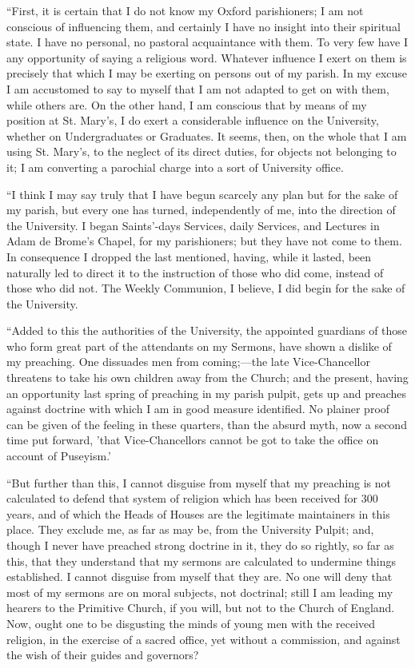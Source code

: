 ``First, it is certain that I do not know my Oxford parishioners;
I am not conscious of influencing them, and certainly I have no insight
into their spiritual state. I have no personal, no pastoral acquaintance
with them. To very few have I any opportunity of saying a religious
word. Whatever influence I exert on them is precisely that which I may
be exerting on persons out of my parish. In my excuse I am accustomed to
say to myself that I am not adapted to get on with them, while others
are. On the other hand, I am conscious that by means of my position at
St. Mary's, I do exert a considerable influence on the University,
whether on Undergraduates or Graduates. It seems, then, on the whole
that I am using St. Mary's, to the neglect of its direct duties, for
objects not belonging to it; I am converting a parochial charge
into a sort of University office.

``I think I may say truly that I have begun scarcely any plan but
for the sake of my parish, but every one has turned, independently of
me, into the direction of the University. I began Saints'-days Services,
daily Services, and Lectures in Adam de Brome's Chapel, for my
parishioners; but they have not come to them. In consequence I dropped
the last mentioned, having, while it lasted, been naturally led to
direct it to the instruction of those who did come, instead of those who
did not. The Weekly Communion, I believe, I did begin for the sake of
the University.

``Added to this the authorities of the University, the appointed
guardians of those who form great part of the attendants on my Sermons,
have shown a dislike of my preaching. One dissuades men from coming;—the late Vice-Chancellor threatens to take his own children
away from the Church; and the present, having an opportunity last spring
of preaching in my parish pulpit, gets up and preaches against doctrine
with which I am in good measure identified. No plainer proof can be
given of the feeling in these quarters, than the absurd myth, now a
second time put forward, 'that Vice-Chancellors cannot be got
to take the office on account of Puseyism.'

``But further than this, I cannot disguise from myself that my
preaching is not calculated to defend that system of religion which has
been received for 300 years, and of which the Heads of Houses are the
legitimate maintainers in this place. They exclude me, as far as may be,
from the University Pulpit; and, though I never have preached strong
doctrine in it, they do so rightly, so far as this, that they understand
that my sermons are calculated to undermine things established. I cannot
disguise from myself that they are. No one will deny that most of my
sermons are on moral subjects, not doctrinal; still I am leading my
hearers to the Primitive Church, if you will, but not to the Church of
England. Now, ought one to be disgusting the minds of young men with the
received religion, in the exercise of a sacred office, yet without a
commission, and against the wish of their guides and governors?

